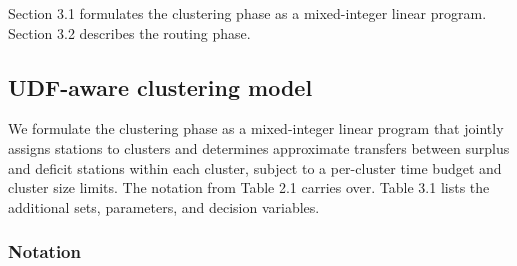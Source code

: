 \documentclass[11pt]{article}
\numberwithin{table}{section}
\numberwithin{figure}{section}
\begin{document}
Section 3.1 formulates the clustering phase as a mixed-integer linear program. Section 3.2 describes the routing phase.

\subsection{UDF-aware clustering model}

We formulate the clustering phase as a mixed-integer linear program that jointly assigns stations to clusters and determines approximate transfers between surplus and deficit stations within each cluster, subject to a per-cluster time budget and cluster size limits. The notation from Table 2.1 carries over. Table 3.1 lists the additional sets, parameters, and decision variables.

\subsubsection{Notation}
\end{document}
